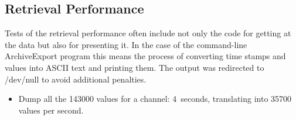 \subsection{Retrieval Performance}
Tests of the retrieval performance often include not only the
code for getting at the data but also for presenting it. In the
case of the command-line ArchiveExport program this means the process
of converting time stamps and values into ASCII text and printing them.
The output was redirected to /dev/null to avoid additional penalties.

\begin{itemize}
\item Dump all the 143000 values for a channel: 4~seconds,
      translating into 35700 values per second.
\end{itemize}
